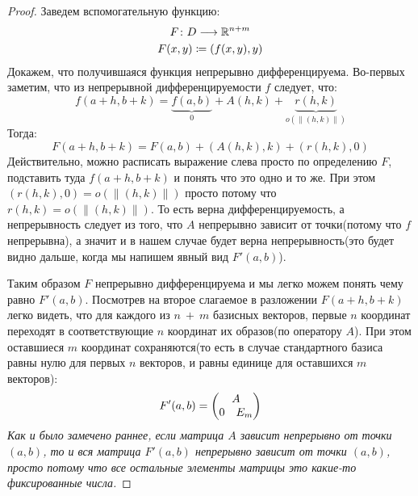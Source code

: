   \begin{proof}
    Заведем вспомогательную функцию:
    \begin{equation*}
      \begin{gathered}
        F\colon D \longrightarrow \mathbb{R}^{n + m} \\
        F(x, y) \coloneqq (f(x, y), y)
      \end{gathered}
    \end{equation*}
    Докажем, что получившаяся функция непрерывно дифференцируема. Во-первых заметим, что из непрерывной дифференцируемости $f$ следует, что:
    \begin{equation*}
      f(a + h, b + k) = \underbrace{f(a, b)}_{0} + A(h, k) + \underbrace{r(h, k)}_{o(\|(h, k)\|)}
    \end{equation*}
    Тогда:
    \begin{equation*}
      F(a + h, b + k) = F(a, b) + (A(h, k), k) + (r(h, k), 0)
    \end{equation*}
    Действительно, можно расписать выражение слева просто по определению $F$, подставить туда $f(a + h, b + k)$ и понять что это одно и то же. При этом $(r(h, k), 0) = o(\| (h, k) \|)$ просто потому что $r(h, k) = o(\| (h, k) \|)$. То есть верна дифференцируемость, а непрерывность следует из того, что $A$ непрерывно зависит от точки(потому что $f$ непрерывна), а значит и в нашем случае будет верна непрерывность(это будет видно дальше, когда мы напишем явный вид $F'(a, b)$).
  
    Таким образом $F$ непрерывно дифференцируема и мы легко можем понять чему равно $F'(a, b)$. Посмотрев на второе слагаемое в разложении $F(a + h, b + k)$ легко видеть, что для каждого из $n~+~m$ базисных векторов, первые $n$ координат переходят в соответствующие $n$ координат их образов(по оператору $A$). При этом оставшиеся $m$ координат сохраняются(то есть в случае стандартного базиса равны нулю для первых $n$ векторов, и равны единице для оставшихся $m$ векторов):
    \begin{equation*}
      F'(a, b) =
      \begin{pmatrix}
        \multicolumn{2}{c}{A} \\
        0 & E_m
      \end{pmatrix}
    \end{equation*}
    \textit{Как и было замечено раннее, если матрица $A$ зависит непрерывно от точки $(a, b)$, то и вся матрица $F'(a, b)$ непрерывно зависит от точки $(a, b)$, просто потому что все остальные элементы матрицы это какие-то фиксированные числа.}
  

\end{proof}
